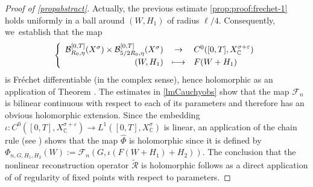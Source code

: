 \documentclass[10pt]{amsart}
\newcommand\mto{\mathchoice{\longmapsto}{\mapsto}{\mapsto}{\mapsto}}
\theoremstyle{definition}
\let\mc\mathcal
\let\veps\varepsilon
\newcommand{\B}{\mc{B}}
\newcommand\FL{\mathcal{F}_{n}}
\let\dpl\displaystyle
\begin{document}
\begin{proof}[Proof of \cref{propabstract}]
Actually, the previous estimate \eqref{prop:proof:frechet-1} holds uniformly in a ball around $(W, H_1)$ of radius $\ell/4$. Consequently, we~establish that the map
\begin{align*}
\left\{\begin{array}{rcl}
\B_{R_{0}, \eta}^{[0,T]}(X^{\sigma}) \times \B_{5/2R_{0}, \eta}^{[0,T]}(X^{\sigma}) &\dpl\to& C^0([0, T], X_\mathbb{C}^{\sigma+\veps})\\[3pt]
(W, H_1 )&\dpl\mto& F(W+H_1)
\end{array}\right.
\end{align*}
is Fréchet differentiable (in the complex sense), hence holomorphic as an application of Theorem \cite[Th.\,13.16]{Muj86}. The estimates in \cref{lmCauchyobs} show that the map $\FL$ is bilinear continuous with respect to each of its parameters and therefore has an obvious holomorphic extension. Since the embedding $\iota: C^0([0,T],X_{\mathbb{C}}^{\sigma+\veps})\to L^1([0,T],X_{\mathbb{C}}^{\sigma})$ is linear, an application of the chain rule (see \cite[Th.\,13.6]{Muj86}) shows that the map $\widehat{\Phi}$ is holomorphic since it is defined by $\Phi_{n,G,H_{1},H_{2}}(W):=\FL (G,\iota\left(F(W+H_{1})+H_{2}\right)) $. The conclusion that the nonlinear reconstruction operator $\mathcal{\widetilde{R}}$ is holomorphic follows as a direct application of \cite[Th.\,2.2]{1982:chow-hale:bifurcation-theory} of regularity of fixed points with respect to parameters.
\end{proof}
\end{document}
